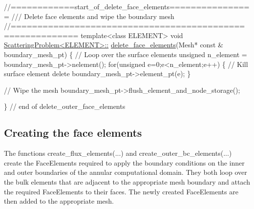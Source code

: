  
\begin{DoxyCodeInclude}
\textcolor{comment}{//============start\_of\_delete\_face\_elements================}
\textcolor{comment}{/// Delete face elements and wipe the boundary mesh}
\textcolor{comment}{}\textcolor{comment}{//==========================================================}
\textcolor{keyword}{template}<\textcolor{keyword}{class} ELEMENT>
\textcolor{keywordtype}{void} \hyperlink{classScatteringProblem_aaef8a78e317333ddadd0be6a500c1134}{ScatteringProblem<ELEMENT>::}
\hyperlink{classScatteringProblem_aaef8a78e317333ddadd0be6a500c1134}{delete\_face\_elements}(Mesh* \textcolor{keyword}{const} & boundary\_mesh\_pt)
\{
 \textcolor{comment}{// Loop over the surface elements}
 \textcolor{keywordtype}{unsigned} n\_element = boundary\_mesh\_pt->nelement();
 \textcolor{keywordflow}{for}(\textcolor{keywordtype}{unsigned} e=0;e<n\_element;e++)
  \{
   \textcolor{comment}{// Kill surface element}
   \textcolor{keyword}{delete}  boundary\_mesh\_pt->element\_pt(e);
  \}
 
 \textcolor{comment}{// Wipe the mesh}
 boundary\_mesh\_pt->flush\_element\_and\_node\_storage();
 
\} \textcolor{comment}{// end of delete\_outer\_face\_elements}

\end{DoxyCodeInclude}




 

\hypertarget{index_create_flux}{}\subsection{Creating the face elements}\label{index_create_flux}
The functions {\ttfamily create\+\_\+flux\+\_\+elements}(...) and {\ttfamily create\+\_\+outer\+\_\+bc\+\_\+elements}(...) create the {\ttfamily Face\+Elements} required to apply the boundary conditions on the inner and outer boundaries of the annular computational domain. They both loop over the bulk elements that are adjacent to the appropriate mesh boundary and attach the required {\ttfamily Face\+Elements} to their faces. The newly created {\ttfamily Face\+Elements} are then added to the appropriate mesh.

